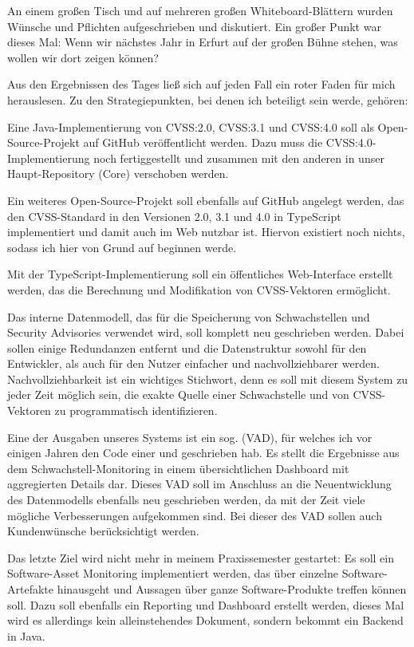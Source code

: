 An einem großen Tisch und auf mehreren großen Whiteboard-Blättern wurden Wünsche und Pflichten aufgeschrieben und diskutiert.
Ein großer Punkt war dieses Mal:
Wenn wir nächstes Jahr in Erfurt auf der großen Bühne stehen, was wollen wir dort zeigen können?

Aus den Ergebnissen des Tages ließ sich auf jeden Fall ein roter Faden für mich herauslesen.
Zu den Strategiepunkten, bei denen ich beteiligt sein werde, gehören:

\begin{smitemize}
    \item Eine Java-Implementierung von CVSS:2.0, CVSS:3.1 und CVSS:4.0 soll als Open-Source-Projekt auf GitHub veröffentlicht werden.
    Dazu muss die CVSS:4.0-Implementierung noch fertiggestellt und zusammen mit den anderen in unser Haupt-Repository (Core) verschoben werden.
    \item Ein weiteres Open-Source-Projekt soll ebenfalls auf GitHub angelegt werden, das den CVSS-Standard in den Versionen 2.0, 3.1 und 4.0 in TypeScript implementiert und damit auch im Web nutzbar ist.
    Hiervon existiert noch nichts, sodass ich hier von Grund auf beginnen werde.
    \item Mit der TypeScript-Implementierung soll ein öffentliches Web-Interface erstellt werden, das die Berechnung und Modifikation von CVSS-Vektoren ermöglicht.
    \item Das interne Datenmodell, das für die Speicherung von Schwachstellen und Security Advisories verwendet wird, soll komplett neu geschrieben werden.
    Dabei sollen einige Redundanzen entfernt und die Datenstruktur sowohl für den Entwickler, als auch für den Nutzer einfacher und nachvollziehbarer werden.
    Nachvollziehbarkeit ist ein wichtiges Stichwort, denn es soll mit diesem System zu jeder Zeit möglich sein, die exakte Quelle einer Schwachstelle und von CVSS-Vektoren zu programmatisch identifizieren.
    \item Eine der Ausgaben unseres Systems ist ein sog.  (VAD), für welches ich vor einigen Jahren den Code einer  und  geschrieben hab.
    Es stellt die Ergebnisse aus dem Schwachstell-Monitoring in einem übersichtlichen Dashboard mit aggregierten Details dar.
    Dieses VAD soll im Anschluss an die Neuentwicklung des Datenmodells ebenfalls neu geschrieben werden, da mit der Zeit viele mögliche Verbesserungen aufgekommen sind.
    Bei dieser  des VAD sollen auch Kundenwünsche berücksichtigt werden.
    \item Das letzte Ziel wird nicht mehr in meinem Praxissemester gestartet:
    Es soll ein Software-Asset Monitoring implementiert werden, das über einzelne Software-Artefakte hinausgeht und Aussagen über ganze Software-Produkte treffen können soll.
    Dazu soll ebenfalls ein Reporting und Dashboard erstellt werden, dieses Mal wird es allerdings kein alleinstehendes Dokument, sondern bekommt ein Backend in Java.
\end{smitemize}


